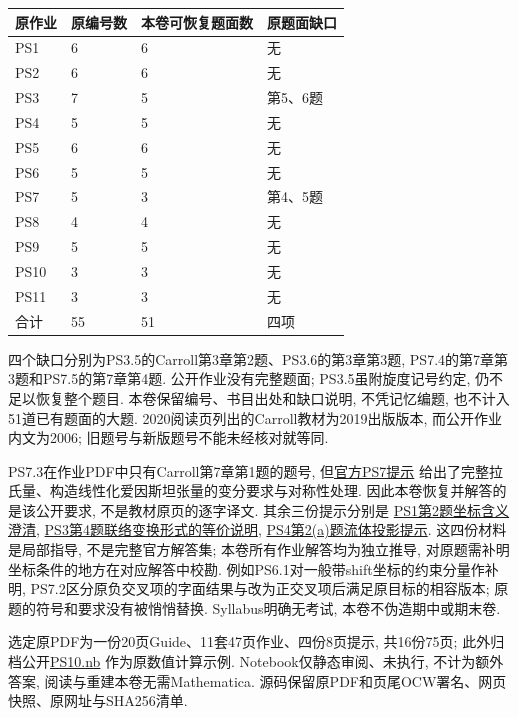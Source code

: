 \begin{center}
\small
\begin{tabular}{@{}llll@{}}
\toprule
原作业 & 原编号数 & 本卷可恢复题面数 & 原题面缺口\\
\midrule
PS1 & 6 & 6 & 无\\
PS2 & 6 & 6 & 无\\
PS3 & 7 & 5 & 第5、6题\\
PS4 & 5 & 5 & 无\\
PS5 & 6 & 6 & 无\\
PS6 & 5 & 5 & 无\\
PS7 & 5 & 3 & 第4、5题\\
PS8 & 4 & 4 & 无\\
PS9 & 5 & 5 & 无\\
PS10 & 3 & 3 & 无\\
PS11 & 3 & 3 & 无\\
\midrule
合计 & 55 & 51 & 四项\\
\bottomrule
\end{tabular}
\end{center}

四个缺口分别为PS3.5的Carroll第3章第2题、PS3.6的第3章第3题,
PS7.4的第7章第3题和PS7.5的第7章第4题.
公开作业没有完整题面; PS3.5虽附旋度记号约定, 仍不足以恢复整个题目.
本卷保留编号、书目出处和缺口说明, 不凭记忆编题, 也不计入51道已有题面的大题.
2020阅读页列出的Carroll教材为2019出版版本, 而公开作业内文为2006;
旧题号与新版题号不能未经核对就等同.

PS7.3在作业PDF中只有Carroll第7章第1题的题号,
但\href{https://ocw.mit.edu/courses/8-962-general-relativity-spring-2020/resources/mit8_962s20_pset07_hint/}{官方PS7提示}
给出了完整拉氏量、构造线性化爱因斯坦张量的变分要求与对称性处理.
因此本卷恢复并解答的是该公开要求, 不是教材原页的逐字译文.
其余三份提示分别是
\href{https://ocw.mit.edu/courses/8-962-general-relativity-spring-2020/resources/mit8_962s20_pset01_hint/}{PS1第2题坐标含义澄清},
\href{https://ocw.mit.edu/courses/8-962-general-relativity-spring-2020/resources/mit8_962s20_pset03_hint/}{PS3第4题联络变换形式的等价说明},
\href{https://ocw.mit.edu/courses/8-962-general-relativity-spring-2020/resources/mit8_962s20_pset04_hint/}{PS4第2(a)题流体投影提示}.
这四份材料是局部指导, 不是完整官方解答集;
本卷所有作业解答均为独立推导, 对原题需补明坐标条件的地方在对应解答中校勘.
例如PS6.1对一般带shift坐标的约束分量作补明,
PS7.2区分原负交叉项的字面结果与改为正交叉项后满足原目标的相容版本;
原题的符号和要求没有被悄悄替换.
Syllabus明确无考试, 本卷不伪造期中或期末卷.

选定原PDF为一份20页Guide、11套47页作业、四份8页提示, 共16份75页;
此外归档公开\href{https://ocw.mit.edu/courses/8-962-general-relativity-spring-2020/resources/ps10/}{PS10.nb}
作为原数值计算示例. Notebook仅静态审阅、未执行, 不计为额外答案,
阅读与重建本卷无需Mathematica.
源码保留原PDF和页尾OCW署名、网页快照、原网址与SHA256清单.


